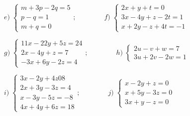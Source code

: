 \begin{enumerate}
$e)\; \begin{cases}  m+3p-2q=5\\p-q=1\\m+q=0  \end{cases}; \qquad \qquad f)\;\begin{cases}  2x+y+t=0\\3x-4y+z-2t=1\\x+2y-z+4t=-1  \end{cases}$ 

$g)\; \begin{cases}  11x-22y+5z=24\\2x-4y+z=7\\-3x+6y-2z=4  \end{cases}; \qquad \qquad h)\;\begin{cases}  2u-v+w=7\\3u+2v-2w=1   \end{cases}$ 

$i)\; \begin{cases} 3x-2y+4z08\\2x+3y-3z=4\\x-3y-5z=-8\\4x+4y+6z=18  \end{cases}; \qquad \qquad j)\; \begin{cases}  x-2y+z=0\\x+5y-3z=0\\3x+y-z=0 \end{cases}$

\vspace{2mm}








\end{enumerate}
